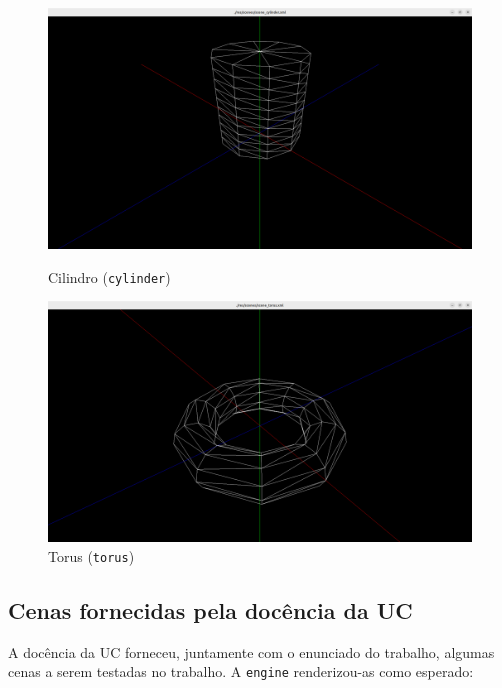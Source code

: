 \documentclass[12pt, a4paper]{article}
\begin{document}
\begin{figure}[H]
    \centering
    \begin{minipage}{0.48\textwidth}
        \centering
        \includegraphics[width=\textwidth]{res/results/Cylinder.png}
        \caption{Cilindro (\texttt{cylinder})}
    \end{minipage}
    \begin{minipage}{0.48\textwidth}
        \centering
        \includegraphics[width=\textwidth]{res/results/Torus.png}
        \caption{Torus (\texttt{torus})}
    \end{minipage}
\end{figure}

\subsection{Cenas fornecidas pela docência da UC}

A docência da UC forneceu, juntamente com o enunciado do trabalho, algumas cenas a serem testadas no
trabalho. A \texttt{engine} renderizou-as como esperado:
\end{document}

